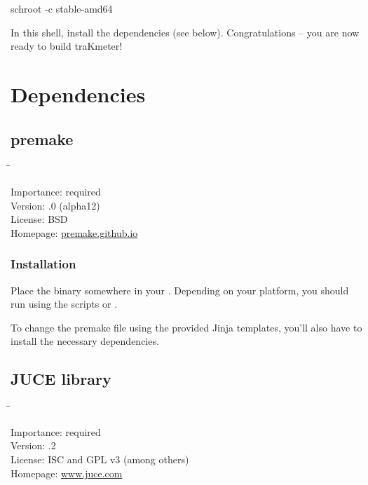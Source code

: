 \begin{Verbatim64}
  schroot -c stable-amd64
\end{Verbatim64}

In this  shell, install the dependencies (see below).
Congratulations -- you are now ready to build traKmeter!

\section{Dependencies}

\subsection{premake}
\label{sec:dependencies_premake}

\begin{tabbing}
  \hspace*{6em}\=\=\kill

  Importance:  \> required \\
  Version:     .0 (alpha12) \\
  License:     \> BSD \\
  Homepage:    \> \href{https://premake.github.io/}{premake.github.io}
\end{tabbing}

\subsubsection{Installation}

Place the binary somewhere in your .  Depending on your
platform, you should run  using the scripts
 or .

To change the premake file using the provided Jinja templates, you'll
also have to install the necessary dependencies.

\newpage %

\subsection{JUCE library}

\begin{tabbing}
  \hspace*{6em}\=\=\kill

  Importance:  \> required \\
  Version:     .2 \\
  License:     \> ISC and GPL v3 (among others) \\
  Homepage:    \> \href{http://www.juce.com/}{www.juce.com}
\end{tabbing}

